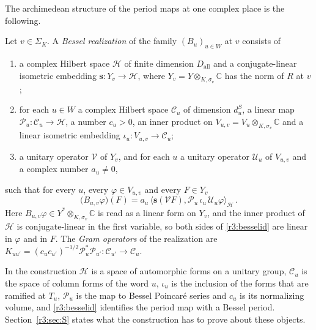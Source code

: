 The archimedean structure of the period maps at one complex place is the following.

\begin{definition}\label{r3:bessel}
Let $v\in\Sigma_K$. A \emph{Bessel realization} of the family $(B_u)_{u\in W}$ at $v$ consists of
\begin{enumerate}
\item a complex Hilbert space $\mathcal H$ of finite dimension $D_{\mathrm{all}}$ and a conjugate-linear isometric embedding $\mathbf s\colon Y_v\to\mathcal H$, where $Y_v=Y\otimes_{K,\sigma_v}\mathbb C$ has the norm of $R$ at $v$;
\item for each $u\in W$ a complex Hilbert space $\mathcal C_u$ of dimension $d^S_u$, a linear map $\mathcal P_u\colon\mathcal C_u\to\mathcal H$, a number $c_u>0$, an inner product on $V_{u,v}=V_u\otimes_{K,\sigma_v}\mathbb C$ and a linear isometric embedding $\iota_u\colon V_{u,v}\to\mathcal C_u$;
\item a unitary operator $\mathcal V$ of $Y_v$, and for each $u$ a unitary operator $\mathcal U_u$ of $V_{u,v}$ and a complex number $a_u\ne0$,
\end{enumerate}
such that for every $u$, every $\varphi\in V_{u,v}$ and every $F\in Y_v$
\begin{equation}\label{r3:besselid}
\big(B_{u,v}\varphi\big)(F)=a_u\,\big\langle\mathbf s(\mathcal VF),\mathcal P_u\,\iota_u\,\mathcal U_u\varphi\big\rangle_{\mathcal H}\,.
\end{equation}
Here $B_{u,v}\varphi\in Y^*\otimes_{K,\sigma_v}\mathbb C$ is read as a linear form on $Y_v$, and the inner product of $\mathcal H$ is conjugate-linear in the first variable, so both sides of \eqref{r3:besselid} are linear in $\varphi$ and in $F$. The \emph{Gram operators} of the realization are $K_{uu'}=(c_uc_{u'})^{-1/2}\mathcal P_u^*\mathcal P_{u'}\colon\mathcal C_{u'}\to\mathcal C_u$.
\end{definition}

In the construction $\mathcal H$ is a space of automorphic forms on a unitary group, $\mathcal C_u$ is the space of column forms of the word $u$, $\iota_u$ is the inclusion of the forms that are ramified at $T_u$, $\mathcal P_u$ is the map to Bessel Poincar\'e series and $c_u$ is its normalizing volume, and \eqref{r3:besselid} identifies the period map with a Bessel period. Section~\ref{r3:sec:S} states what the construction has to prove about these objects.

